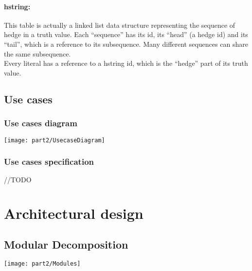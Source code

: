 \documentclass[../gr-final.tex]{subfiles}
\begin{document}
\paragraph{hstring:}
This table is actually a linked list data structure representing
the sequence of hedge in a truth value. Each ``sequence'' has its id,
its ``head'' (a hedge id) and its ``tail'', which is a reference to
its subsequence. Many different sequences can share the same
subsequence.\\
Every literal has a reference to a hstring id, which is the ``hedge'' part
of its truth value.
\subsection{Use cases}

\subsubsection{Use cases diagram}
\texttt{[image: part2/UsecaseDiagram]}

\subsubsection{Use cases specification}
{\huge //TODO}



\section{Architectural design}
\subsection{Modular Decomposition}
\texttt{[image: part2/Modules]}
\end{document}
